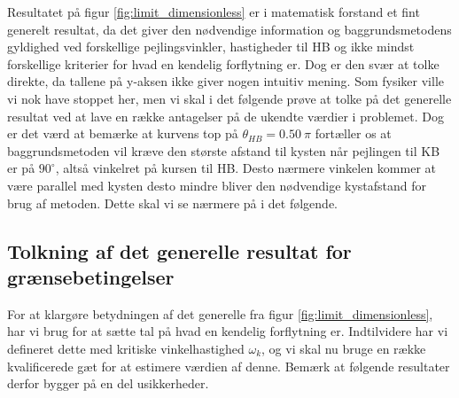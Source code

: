 \documentclass[%
 reprint,
nofootinbib,
aps,
]{revtex4-1}
\begin{document}
Resultatet på figur \ref{fig:limit_dimensionless} er i matematisk forstand et fint generelt resultat, da det giver den nødvendige information og baggrundsmetodens gyldighed ved forskellige pejlingsvinkler, hastigheder til HB og ikke mindst forskellige kriterier for hvad en kendelig forflytning er. Dog er den svær at tolke direkte, da tallene på y-aksen ikke giver nogen intuitiv mening. Som fysiker ville vi nok have stoppet her, men vi skal i det følgende prøve at tolke på det generelle resultat ved at lave en række antagelser på de ukendte værdier i problemet. Dog er det værd at bemærke at kurvens top på $\theta_{HB} = 0.50 \ \pi$ fortæller os at baggrundsmetoden vil kræve den største afstand til kysten når pejlingen til KB er på $90^{\circ}$, altså vinkelret på kursen til HB. Desto nærmere vinkelen kommer at være parallel med kysten desto mindre bliver den nødvendige kystafstand for brug af metoden. Dette skal vi se nærmere på i det følgende.

\subsection{Tolkning af det generelle resultat for grænsebetingelser}
For at klargøre betydningen af det generelle fra figur \ref{fig:limit_dimensionless}, har vi brug for at sætte tal på hvad en kendelig forflytning er. Indtilvidere har vi defineret dette med kritiske vinkelhastighed $\omega_k$, og vi skal nu bruge en række kvalificerede gæt for at estimere værdien af denne. Bemærk at følgende resultater derfor bygger på en del usikkerheder.
\end{document}
